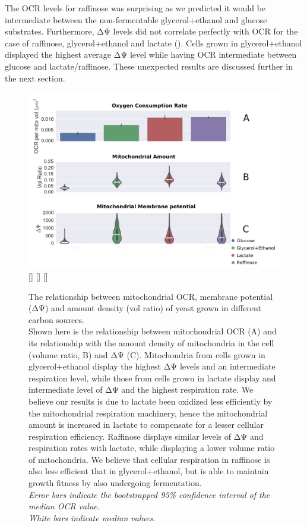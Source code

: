 The OCR levels for raffinose was surprising as we predicted it would be intermediate between the non-fermentable glycerol+ethanol and glucose substrates. Furthermore, ΔΨ levels did not correlate perfectly with OCR for the case of raffinose, glycerol+ethanol and lactate (). Cells grown in glycerol+ethanol displayed the highest average ΔΨ level while having OCR intermediate between glucose and lactate/raffinose. These unexpected results are discussed further in the next section.
%
\begin{figure}[htp]
	\centering
    \includegraphics[width=\textwidth]{o2dy}
       [\linewidth]{}
      [\linewidth]{}
       [\linewidth]{}
    \caption[Relationship between mitochondrial OCR, membrane potential (ΔΨ) and amount density (volume ratio) of yeast grown in different carbon sources.]{The relationship between mitochondrial OCR, membrane potential (ΔΨ) and amount density (vol ratio) of yeast grown in different carbon sources.\\
Shown here is the relationship between mitochondrial OCR (A) and its relationship with the amount density of mitochondria in the cell (volume ratio, B) and ΔΨ (C). Mitochondria from cells grown in glycerol+ethanol display the highest ΔΨ levels and an intermediate respiration level, while those from cells grown in lactate display and intermediate level of ΔΨ and the highest respiration rate. We believe our results is due to lactate been oxidized less efficiently by the mitochondrial respiration machinery, hence the mitochondrial amount is increased in lactate to  compensate for a lesser cellular respiration efficiency. Raffinose displays similar levels of ΔΨ and respiration rates with lactate, while displaying a lower volume ratio of mitochondria. We believe that cellular respiration in raffinose is also less efficient that in glycerol+ethanol, but is able to maintain growth fitness by also undergoing fermentation.\\\emph{Error bars indicate the bootstrapped 95\% confidence interval of the median OCR value.\\White bars indicate median values.}}\label{fig:O2dy}
\end{figure}
%
